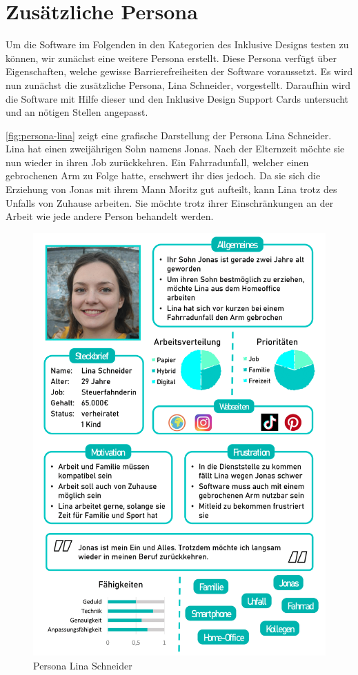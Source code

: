 \section{Zusätzliche Persona}

Um die Software im Folgenden in den Kategorien des Inklusive Designs testen zu können, wir zunächst eine weitere Persona erstellt.
Diese Persona verfügt über Eigenschaften, welche gewisse Barrierefreiheiten der Software voraussetzt.
Es wird nun zunächst die zusätzliche Persona, Lina Schneider, vorgestellt.
Daraufhin wird die Software mit Hilfe dieser und den Inklusive Design Support Cards \cite{ITToolkit} untersucht und an nötigen Stellen angepasst.

\autoref{fig:persona-lina} zeigt eine grafische Darstellung der Persona Lina Schneider.
Lina hat einen zweijährigen Sohn namens Jonas.
Nach der Elternzeit möchte sie nun wieder in ihren Job zurückkehren.
Ein Fahrradunfall, welcher einen gebrochenen Arm zu Folge hatte, erschwert ihr dies jedoch.
Da sie sich die Erziehung von Jonas mit ihrem Mann Moritz gut aufteilt, kann Lina trotz des Unfalls von Zuhause arbeiten.
Sie möchte trotz ihrer Einschränkungen an der Arbeit wie jede andere Person behandelt werden.

\begin{figure}[htp]
    \centering
    \includegraphics[width=\textwidth]{images/persona_2.png}
    \caption{Persona Lina Schneider}
    \label{fig:persona-lina}
\end{figure}